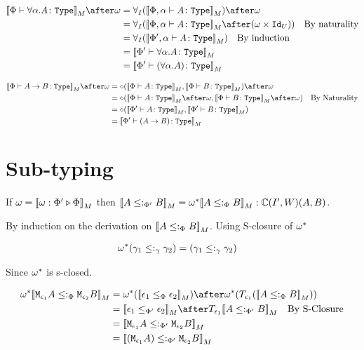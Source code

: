 \documentclass{report}
\begin{document}
    \begin{align}
        \deno{\typerelation{\P}{\all{\a}A}{\type}}\after\w & = \allI(\deno{\typerelation{\P,\a}{A}{\type}})\after\w\\
        & = \allI(\deno{\typerelation{\P,\a}{A}{\type}}\after(\w\times\Id{U}))\qt{By naturality}\\
        & = \allI(\deno{\typerelation{\P',\a}{A}{\type}})\qt{By induction}\\
        & = \deno{\typerelation{\P'}{\all{\a}{A}}{\type}}\\
        & = \deno{\typerelation{\P'}{(\all{\a}{A})}{\type}}\\
    \end{align}

\begin{align}
    \deno{\typerelation{\P}{\ab}{\type}}\after\w &= \diamond(\deno{\typerelation{\P}{A}{\type}},\deno{\typerelation{\P}{B}{\type}})\after\w\\
    &= \diamond(\deno{\typerelation{\P}{A}{\type}}\after\w,\deno{\typerelation{\P}{B}{\type}}\after\w)\qt{By Naturality}\\
    & = \diamond(\deno{\typerelation{\P'}{A}{\type}},\deno{\typerelation{\P'}{B}{\type}})\\
    & = \deno{\typerelation{\P'}{(\ab)}{\type}}\\
\end{align}

\section{Sub-typing}
If $\omega = {\bf [\![}\omega : \Phi' \triangleright \Phi{\bf ]\!]}_M$ then ${\bf [\![}A\leq:_{\Phi'} B{\bf ]\!]}_M = \omega^*{\bf [\![}A\leq:_\Phi B{\bf ]\!]}_M: \mathbb{C}(I', W)(A, B)$.

\proof
By induction on the derivation on ${\bf [\![}A\leq:_\Phi B{\bf ]\!]}_M$. Using S-closure of $\omega^*$ 

\begin{align}
    \omega^*(\gamma_1\leq:_\gamma\gamma_2) &= (\gamma_1\leq:_\gamma\gamma_2)
\end{align}

Since $\omega^*$ is s-closed.

\begin{align}
    \w\star\deno{\M{\e_1}{A} \subtypep \M{\e_2}{B}} & = \w\star(\deno{\e_1\subeffectp\e_2})\after\w\star(\T{\e_1}(\deno{A\subtypep B})) \\ 
     &= \deno{\e_1\subeffectpp\e_2} \after \T{\e_1}{\deno{A\subtypepp B}}\qt{By S-Closure}\\
     &= \deno{\M{\e_1}{A}\subtypepp\M{\e_2}{B}}\\
     &= \deno{(\M{\e_1}{A})\subtypepp\M{\e_2}{B}}\\
\end{align}
\end{document}
